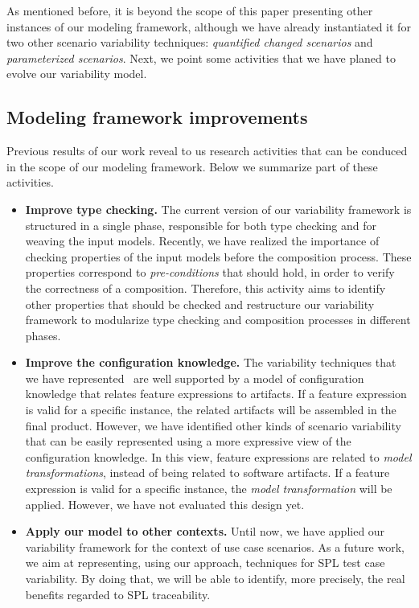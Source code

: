 \documentclass[times, 11pt,twocolumn]{article}
\begin{document}
As mentioned before, it is beyond the scope of this paper presenting other
instances of our modeling framework, although we have already instantiated it
for two other scenario variability techniques: \emph{quantified changed
scenarios} and \emph{parameterized scenarios}. Next, we point some activities
that we have planed to evolve our variability model.

\subsection{Modeling framework improvements}

Previous results of our work reveal to us research activities that can
be conduced in the scope of our modeling framework. Below we summarize part of
these activities.

\noindent

\begin{itemize}
\item {\bf Improve type checking.} The current version of our variability
  framework is structured in a single phase, responsible for both type checking and
  for weaving the input models. Recently, we have realized the importance of
  checking properties of the input models before the composition process.
  These properties correspond to \emph{pre-conditions} that should hold, in
  order to verify the correctness of a composition. Therefore, this activity
  aims to identify other properties that should be checked and restructure our
  variability framework to modularize type checking and composition processes in
  different phases.
\item {\bf Improve the configuration knowledge.} The variability techniques that
  we have represented~\cite{Bonifacio:2008ab} are well supported by a model of
  configuration knowledge that relates feature
  expressions to artifacts. If a feature expression is valid for a
  specific instance, the related artifacts will be assembled in the final
  product. However, we have identified other kinds of scenario variability that
  can be easily represented using a more expressive view of the configuration
  knowledge. In this view, feature expressions are related to \emph{model
  transformations}, instead of being related to software artifacts. If a
  feature expression is valid for a specific instance, the \emph{model
  transformation} will be applied. However, we have not evaluated this design
  yet.
  
\item {\bf Apply our model to other contexts.} Until now, we have applied our
  variability framework for the context of use case scenarios. As a future
  work, we aim at representing, using our approach, techniques for SPL test
  case variability. By doing that, we will be able to identify, more
  precisely, the real benefits regarded to SPL traceability.
\end{itemize}
 
\end{document}
